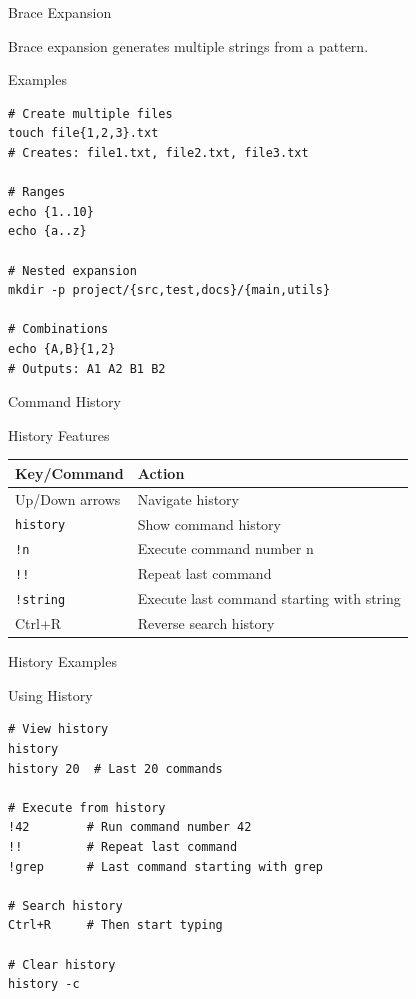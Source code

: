 \documentclass[presentation,aspectratio=1610]{beamer}
\begin{document}
\begin{frame}[label={sec:org84b8dbe},fragile]{Brace Expansion}
 \begin{definition}\label{sec:org3ddc37b}
Brace expansion generates multiple strings from a pattern.
\end{definition}
\begin{block}{Examples}
\begin{verbatim}
# Create multiple files
touch file{1,2,3}.txt
# Creates: file1.txt, file2.txt, file3.txt

# Ranges
echo {1..10}
echo {a..z}

# Nested expansion
mkdir -p project/{src,test,docs}/{main,utils}

# Combinations
echo {A,B}{1,2}
# Outputs: A1 A2 B1 B2
\end{verbatim}
\end{block}
\end{frame}
\begin{frame}[label={sec:org7cacb6f},fragile]{Command History}
 \begin{block}{History Features}
\begin{center}
\begin{tabular}{ll}
Key/Command & Action\\
\hline
Up/Down arrows & Navigate history\\
\texttt{history} & Show command history\\
\texttt{!n} & Execute command number n\\
\texttt{!!} & Repeat last command\\
\texttt{!string} & Execute last command starting with string\\
Ctrl+R & Reverse search history\\
\end{tabular}
\end{center}
\end{block}
\end{frame}
\begin{frame}[label={sec:orgcc8a8f0},fragile]{History Examples}
 \begin{block}{Using History}
\begin{verbatim}
# View history
history
history 20  # Last 20 commands

# Execute from history
!42        # Run command number 42
!!         # Repeat last command
!grep      # Last command starting with grep

# Search history
Ctrl+R     # Then start typing

# Clear history
history -c
\end{verbatim}
\end{block}
\end{frame}
\end{document}
